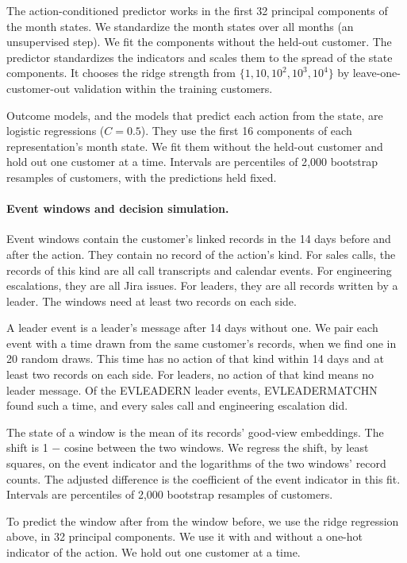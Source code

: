 \documentclass[11pt]{article}
\begin{document}
The action-conditioned predictor works in the first 32 principal components of the month states. We standardize the month states over all months (an unsupervised step). We fit the components without the held-out customer. The predictor standardizes the indicators and scales them to the spread of the state components. It chooses the ridge strength from $\{1, 10, 10^2, 10^3, 10^4\}$ by leave-one-customer-out validation within the training customers.

Outcome models, and the models that predict each action from the state, are logistic regressions ($C = 0.5$). They use the first 16 components of each representation's month state. We fit them without the held-out customer and hold out one customer at a time. Intervals are percentiles of 2{,}000 bootstrap resamples of customers, with the predictions held fixed.

\paragraph{Event windows and decision simulation.} Event windows contain the customer's linked records in the 14 days before and after the action. They contain no record of the action's kind. For sales calls, the records of this kind are all call transcripts and calendar events. For engineering escalations, they are all Jira issues. For leaders, they are all records written by a leader. The windows need at least two records on each side.

A leader event is a leader's message after 14 days without one. We pair each event with a time drawn from the same customer's records, when we find one in 20 random draws. This time has no action of that kind within 14 days and at least two records on each side. For leaders, no action of that kind means no leader message. Of the EVLEADERN leader events, EVLEADERMATCHN found such a time, and every sales call and engineering escalation did.

The state of a window is the mean of its records' good-view embeddings. The shift is 1 $-$ cosine between the two windows. We regress the shift, by least squares, on the event indicator and the logarithms of the two windows' record counts. The adjusted difference is the coefficient of the event indicator in this fit. Intervals are percentiles of 2{,}000 bootstrap resamples of customers.

To predict the window after from the window before, we use the ridge regression above, in 32 principal components. We use it with and without a one-hot indicator of the action. We hold out one customer at a time.
\end{document}
